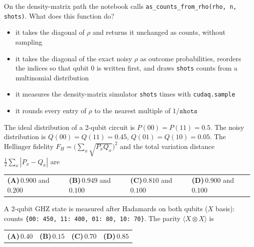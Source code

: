 \documentclass[11pt,a4paper]{article}
\newcommand{\optlabel}[1]{\textbf{(#1)}}
\newenvironment{qitem}[1]{\begin{list}{}{\setlength{\leftmargin}{3.3em}\setlength{\labelwidth}{3.1em}%
  \setlength{\labelsep}{0.2em}\setlength{\topsep}{3pt}\setlength{\parsep}{3pt}}\item[\textbf{Q.#1}\hfill]}{\end{list}}
\newcommand{\qsep}{\par\vspace{2pt}{\color{black!15}\hrule}\vspace{4pt}}
\begin{document}
\begin{qitem}{50}
On the density-matrix path the notebook calls \texttt{as\_counts\_from\_rho(rho, n, shots)}. What does this function do?
\begin{itemize}[leftmargin=2.6em, labelsep=0.4em, itemsep=2pt, topsep=3pt]
\item[\optlabel{A}] it takes the diagonal of $\rho$ and returns it unchanged as counts, without sampling
\item[\optlabel{B}] it takes the diagonal of the exact noisy $\rho$ as outcome probabilities, reorders the indices so that qubit 0 is written first, and draws \texttt{shots} counts from a multinomial distribution
\item[\optlabel{C}] it measures the density-matrix simulator \texttt{shots} times with \texttt{cudaq.sample}
\item[\optlabel{D}] it rounds every entry of $\rho$ to the nearest multiple of $1/\texttt{shots}$
\end{itemize}
\end{qitem}
\qsep

\begin{qitem}{51}
The ideal distribution of a 2-qubit circuit is $P(00) = P(11) = 0.5$. The noisy distribution is $Q(00) = Q(11) = 0.45$, $Q(01) = Q(10) = 0.05$. The Hellinger
fidelity $F_H = \big(\sum_x\sqrt{P_xQ_x}\big)^2$ and the total variation distance $\frac12\sum_x|P_x - Q_x|$ are
\par\smallskip\noindent\begin{tabularx}{\linewidth}{@{}*{4}{L}@{}}
\optlabel{A}\,$0.900$ and $0.200$ & \optlabel{B}\,$0.949$ and $0.100$ & \optlabel{C}\,$0.810$ and $0.100$ & \optlabel{D}\,$0.900$ and $0.100$
\end{tabularx}
\end{qitem}
\qsep

\begin{qitem}{52}
A 2-qubit GHZ state is measured after Hadamards on both qubits ($X$ basis): counts \texttt{\{00: 450, 11: 400, 01: 80, 10: 70\}}. The parity
$\langle X\otimes X\rangle$ is
\par\smallskip\noindent\begin{tabularx}{\linewidth}{@{}*{4}{L}@{}}
\optlabel{A}\,$0.40$ & \optlabel{B}\,$0.15$ & \optlabel{C}\,$0.70$ & \optlabel{D}\,$0.85$
\end{tabularx}
\end{qitem}
\qsep
\end{document}
